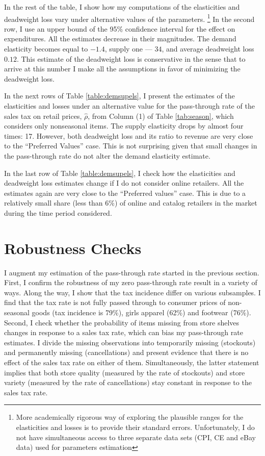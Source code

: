 \documentclass[12pt]{article}
\begin{document}
	

	
	In the rest of the table, I show how my computations of the elasticities and deadweight loss vary under alternative values of the parameters.	\footnote{More academically rigorous way of exploring the plausible ranges for the elasticities and losses is to provide their standard errors. Unfortunately, I do not have simultaneous access to three separate data sets (CPI, CE and eBay data) used for parameters estimation} In the second row, I use an upper bound of the 95\% confidence interval for the effect on expenditures. 				
	All the estimates decrease in their magnitudes. The demand elasticity becomes equal to $-1.4$, supply one --- $34$, and average deadweight loss $0.12$. This estimate of the deadweight loss is conservative in the sense that to arrive at this number I make all the assumptions in favor of minimizing the deadweight loss.
				
	In the next rows of Table \ref{table:demsupels}, I present the estimates of the elasticities and losses under an alternative value for the pass-through rate of the sales tax on retail prices, $\hat{\rho}$, from Column (1) of Table \ref{tab:season}, which considers only nonseasonal items. The supply elasticity drops by almost four times: 17. However, both deadweight loss and its ratio to revenue are very close to the ``Preferred Values'' case. This is not surprising given that small changes in the pass-through rate do not alter the demand elasticity estimate.
				
	In the last row of Table \ref{table:demsupels}, I check how the elasticities and deadweight loss estimates change if I do not consider online retailers. All the estimates again are very close to the ``Preferred values'' case. This is due to a relatively small share (less than 6\%) of online and catalog retailers in the market during the time period considered.
	
	
	
	
	
	\section{Robustness Checks}
	\label{sec:robche}
	I augment my estimation of the pass-through rate started in the previous section. First, I confirm the robustness of my zero pass-through rate result in a variety of ways. Along the way, I show that the tax incidence differ on various subsamples. I find that the tax rate is not fully passed through to consumer prices of non-seasonal goods (tax incidence is 79\%), girls apparel (62\%) and footwear (76\%). Second, I check whether the probability of items missing from store shelves changes in response to a sales tax rate, which can bias my pass-through rate estimates. I divide the missing observations into temporarily missing (stockouts)  and permanently missing (cancellations) and present evidence that there is no effect of the sales tax rate on either of them. Simultaneously, the latter statement implies that both store quality (measured by the rate of stockouts) and store variety (measured by the rate of cancellations) stay constant in response to the sales tax rate.
	
\end{document}
